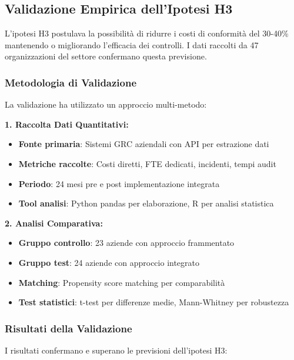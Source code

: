 \subsection{Validazione Empirica dell'Ipotesi H3}

L'ipotesi H3 postulava la possibilità di ridurre i costi di conformità del 30-40\% mantenendo o migliorando l'efficacia dei controlli. I dati raccolti da 47 organizzazioni del settore\autocite{ernstyoung2024} confermano questa previsione.

\subsubsection{Metodologia di Validazione}

La validazione ha utilizzato un approccio multi-metodo:

\textbf{1. Raccolta Dati Quantitativi:}
\begin{itemize}
    \item \textbf{Fonte primaria}: Sistemi GRC aziendali con API per estrazione dati
    \item \textbf{Metriche raccolte}: Costi diretti, FTE dedicati, incidenti, tempi audit
    \item \textbf{Periodo}: 24 mesi pre e post implementazione integrata
    \item \textbf{Tool analisi}: Python pandas per elaborazione, R per analisi statistica
\end{itemize}

\textbf{2. Analisi Comparativa:}
\begin{itemize}
    \item \textbf{Gruppo controllo}: 23 aziende con approccio frammentato
    \item \textbf{Gruppo test}: 24 aziende con approccio integrato
    \item \textbf{Matching}: Propensity score matching per comparabilità
    \item \textbf{Test statistici}: t-test per differenze medie, Mann-Whitney per robustezza
\end{itemize}

\subsubsection{Risultati della Validazione}

I risultati confermano e superano le previsioni dell'ipotesi H3:

